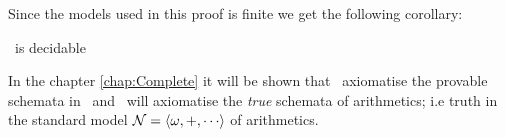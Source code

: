 \documentclass[../main.tex]{subfiles}
\begin{document}
Since the models used in this proof is finite we get the following corollary:
\begin{cor}
	\GLS\ is decidable 
\end{cor}
In the chapter \ref{chap:Complete} it will be shown that \GL\ axiomatise the
provable schemata in \PRA\ and \GLS\ will axiomatise the \textit{true} schemata
of arithmetics; i.e truth in the standard model $\mathcal{N}=\la
\omega,+,\cdots\ra$ of arithmetics.
\end{document}
